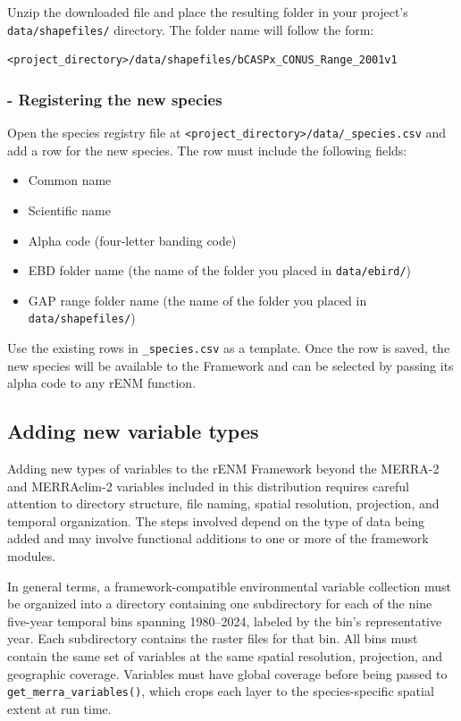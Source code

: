 \documentclass[
  letterpaper,
  DIV=11,
  numbers=noendperiod]{scrartcl}
\providecommand{\tightlist}{%
  \setlength{\itemsep}{0pt}\setlength{\parskip}{0pt}}
\begin{document}
Unzip the downloaded file and place the resulting folder in your
project's \texttt{data/shapefiles/} directory. The folder name will
follow the form:

\begin{verbatim}
<project_directory>/data/shapefiles/bCASPx_CONUS_Range_2001v1
\end{verbatim}

\subsubsection{- Registering the new
species}\label{registering-the-new-species}

Open the species registry file at
\texttt{\textless{}project\_directory\textgreater{}/data/\_species.csv}
and add a row for the new species. The row must include the following
fields:

\begin{itemize}
\tightlist
\item
  Common name
\item
  Scientific name
\item
  Alpha code (four-letter banding code)
\item
  EBD folder name (the name of the folder you placed in
  \texttt{data/ebird/})
\item
  GAP range folder name (the name of the folder you placed in
  \texttt{data/shapefiles/})
\end{itemize}

Use the existing rows in \texttt{\_species.csv} as a template. Once the
row is saved, the new species will be available to the Framework and can
be selected by passing its alpha code to any rENM function.

\subsection{Adding new variable types}\label{adding-new-variable-types}

Adding new types of variables to the rENM Framework beyond the MERRA-2
and MERRAclim-2 variables included in this distribution requires careful
attention to directory structure, file naming, spatial resolution,
projection, and temporal organization. The steps involved depend on the
type of data being added and may involve functional additions to one or
more of the framework modules.

In general terms, a framework-compatible environmental variable
collection must be organized into a directory containing one
subdirectory for each of the nine five-year temporal bins spanning
1980--2024, labeled by the bin's representative year. Each subdirectory
contains the raster files for that bin. All bins must contain the same
set of variables at the same spatial resolution, projection, and
geographic coverage. Variables must have global coverage before being
passed to \texttt{get\_merra\_variables()}, which crops each layer to
the species-specific spatial extent at run time.
\end{document}
